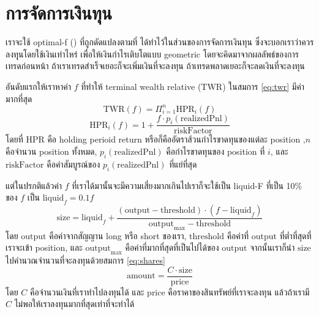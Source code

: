 \section{การจัดการเงินทุน}
เราจะใช้ optimal-f (\cite{Vince}) ที่ถูกดัดแปลงตามที่ \cite{Rodrigo} ได้ทำไว้ในส่วนของการจัดการเงินทุน ซึ่งจะบอกเราว่าควรลงทุุนโดยใช้เงินเท่าไหร่ เพื่อให้เงินกำไรเติบโตแบบ
geometric โดยจะคิดมาจากผลลัพธ์ของการเทรดก่อนหน้า ถ้าเราเทรดสำเร็จเยอะก็จะเพิ่มเงินที่จะลงทุน ถ้าเทรดพลาดเยอะก็จะลดเงินที่จะลงทุน 

อันดับแรกให้เราหาค่า $f$ ที่ทำให้ terminal wealth relative ($\text{TWR}$) ในสมการ \ref{eq:twr} มีค่ามากที่สุด
\begin{equation}
    \text{TWR}(f) = \Pi_{i=1}^{n} \text{HPR}_i(f)
\label{eq:twr}
\end{equation}
\begin{equation}
    \text{HPR}_i(f) = 1 + \frac{f \cdot p_i(\text{realizedPnl})}{\text{riskFactor}}
\end{equation}
โดยที่ $\text{HPR}$ คือ holding perioid return หรือก็คืออัตราส้วนกำไรขาดทุนของแต่ละ position 
,$n$ คือจำนวน position ทั้งหมด, $p_i(\text{realizedPnl})$ คือกำไรขาดทุนของ position ที่ $i$, 
และ $\text{riskFactor}$ คือค่าสัมบูรณ์ของ $p_i(\text{realizedPnl})$ ที่แย่ที่สุด

แต่ในปรกติแล้วค่า $f$ ที่เราได้มานั้นจะมีความเสี่ยงมากเกินไปเราก็จะใช้เป็น liquid-F ที่เป็น 10\% ของ $f$ เป็น $\text{liquid}_f = 0.1f$ 
\begin{equation}
\text{size} = \text{liquid}_f + \frac{(\text{output} - \text{threshold}) \cdot (f - \text{liquid}_f)}{\text{output}_{\text{max}} - \text{threshold}}
\end{equation}
โดย $\text{output}$ คือค่าจากสัญญาน long หรือ short ของเรา, $\text{threshold}$ คือค่าที่ $\text{output}$ ที่ต่ำที่สุดที่เราจะเข้า position, และ 
$\text{output}_{\text{max}}$ คือค่าที่มากที่สุดที่เป็นไปได้ของ $\text{output}$ จากนั้นเราก็นำ $\text{size}$ ไปคำนวณจำนวนที่จะลงทุนด้วยสมการ \ref{eq:shares}
\begin{equation}
\text{amount} = \frac{C \cdot \text{size}}{\text{price}}
\label{eq:shares}
\end{equation}
โดย $C$ คือจำนวนเงินที่เราทำไปลงทุนได้ และ $\text{price}$ คือราคาของสินทรัพย์ที่เราจะลงทุน แล้วถ้าเรามี $C$ ไม่พอให้เราลงทุนมากที่สุดเท่าที่จะทำได้


